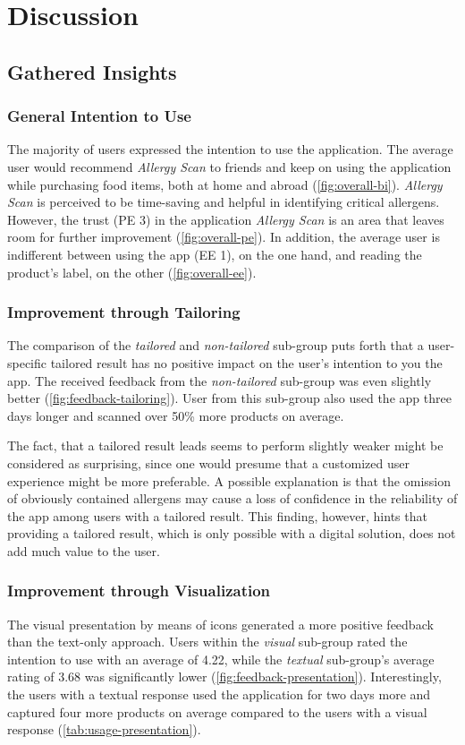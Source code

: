 \chapter{Discussion}
\thispagestyle{fancy}

\section{Gathered Insights}
\subsection{General Intention to Use}
The majority of users expressed the intention to use the application. The average user would recommend \emph{Allergy Scan} to friends and keep on using the application while purchasing food items, both at home and abroad (\cref{fig:overall-bi}). \emph{Allergy Scan} is perceived to be time-saving and helpful in identifying critical allergens. However, the trust (PE 3) in the application \emph{Allergy Scan} is an area that leaves room for further improvement (\cref{fig:overall-pe}). In addition, the average user is indifferent between using the app (EE 1), on the one hand, and reading the product's label, on the other (\cref{fig:overall-ee}).

\subsection{Improvement through Tailoring}
The comparison of the \emph{tailored} and \emph{non-tailored} sub-group puts forth that a user-specific tailored result has no positive impact on the user's intention to you the app. The received feedback from the \emph{non-tailored} sub-group was even slightly better (\cref{fig:feedback-tailoring}). User from this sub-group also used the app three days longer and scanned over 50\% more products on average.

The fact, that a tailored result leads seems to perform slightly weaker might be considered as surprising, since one would presume that a customized user experience might be more preferable. A possible explanation is that the omission of obviously contained allergens may cause a loss of confidence in the reliability of the app among users with a tailored result. This finding, however, hints that providing a tailored result, which is only possible with a digital solution, does not add much value to the user.

\subsection{Improvement through Visualization}
The visual presentation by means of icons generated a more positive feedback than the text-only approach. Users within the \emph{visual} sub-group rated the intention to use with an average of 4.22, while the \emph{textual} sub-group's average rating of 3.68 was significantly lower (\cref{fig:feedback-presentation}). Interestingly, the users with a textual response used the application for two days more and captured four more products on average compared to the users with a visual response (\cref{tab:usage-presentation}).

